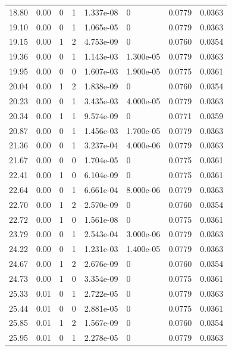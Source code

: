 \documentclass[preview]{standalone}
\begin{document}
{{{\begin{tabular}{L{1.2cm}C{1.2cm} C{0.3cm}C{0.5cm} C{1.4cm}C{1.4cm} C{1.4cm}C{1.4cm}}
  18.80  &  0.00  & 0     &  1 &  1.337e-08  & 0  & 0.0779 &  0.0363   \\ 
  19.10  &  0.00  & 0     &  1 &  1.065e-05  & 0  & 0.0779 &  0.0363   \\ 
  19.15  &  0.00  & 1     &  2 &  4.753e-09  & 0  & 0.0760 &  0.0354   \\ 
  19.36  &  0.00  & 0     &  1 &  1.143e-03  & 1.300e-05  & 0.0779 &  0.0363   \\ 
  19.95  &  0.00  & 0     &  0 &  1.607e-03  & 1.900e-05  & 0.0775 &  0.0361   \\ 
  20.04  &  0.00  & 1     &  2 &  1.838e-09  & 0  & 0.0760 &  0.0354   \\ 
  20.23  &  0.00  & 0     &  1 &  3.435e-03  & 4.000e-05  & 0.0779 &  0.0363   \\ 
  20.34  &  0.00  & 1     &  1 &  9.574e-09  & 0  & 0.0771 &  0.0359   \\ 
  20.87  &  0.00  & 0     &  1 &  1.456e-03  & 1.700e-05  & 0.0779 &  0.0363   \\ 
  21.36  &  0.00  & 0     &  1 &  3.237e-04  & 4.000e-06  & 0.0779 &  0.0363   \\ 
  21.67  &  0.00  & 0     &  0 &  1.704e-05  & 0  & 0.0775 &  0.0361   \\ 
  22.41  &  0.00  & 1     &  0 &  6.104e-09  & 0  & 0.0775 &  0.0361   \\ 
  22.64  &  0.00  & 0     &  1 &  6.661e-04  & 8.000e-06  & 0.0779 &  0.0363   \\ 
  22.70  &  0.00  & 1     &  2 &  2.570e-09  & 0  & 0.0760 &  0.0354   \\ 
  22.72  &  0.00  & 1     &  0 &  1.561e-08  & 0  & 0.0775 &  0.0361   \\ 
  23.79  &  0.00  & 0     &  1 &  2.543e-04  & 3.000e-06  & 0.0779 &  0.0363   \\ 
  24.22  &  0.00  & 0     &  1 &  1.231e-03  & 1.400e-05  & 0.0779 &  0.0363   \\ 
  24.67  &  0.00  & 1     &  2 &  2.676e-09  & 0  & 0.0760 &  0.0354   \\ 
  24.73  &  0.00  & 1     &  0 &  3.354e-09  & 0  & 0.0775 &  0.0361   \\ 
  25.33  &  0.01  & 0     &  1 &  2.722e-05  & 0  & 0.0779 &  0.0363   \\ 
  25.44  &  0.01  & 0     &  0 &  2.881e-05  & 0  & 0.0775 &  0.0361   \\ 
  25.85  &  0.01  & 1     &  2 &  1.567e-09  & 0  & 0.0760 &  0.0354   \\ 
  25.95  &  0.01  & 0     &  1 &  2.278e-05  & 0  & 0.0779 &  0.0363   \\ 

\end{tabular}}}}
\end{document}
